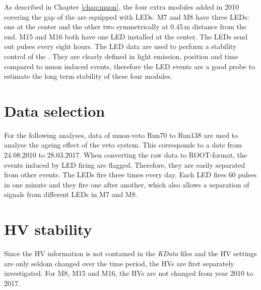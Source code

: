 As described in Chapter \ref{chap:muon}, the four extra modules added in 2010 covering the gap of the \mvs{} are equipped with LEDs. M7 and M8 have three LEDs: one at the center and the other two symmetrically at 0.45\,m distance from the end. M15 and M16 both have one LED installed at the center. The LEDs send out pulses every eight hours. The LED data are used to perform a stability control of the \mvs{}. They are clearly defined in light emission, position and time compared to muon induced events, therefore the LED events are a good probe to estimate the long term stability of these four modules.
\section{Data selection}
For the following analyses, data of muon-veto Run70 to Run138 are used to analyse the ageing effect of the veto system. This corresponds to a date from 24.08.2010 to 28.03.2017. When converting the raw data to ROOT-format, the events induced by LED firing are flagged. Therefore, they are easily separated from other events.
The LEDs fire three times every day. Each LED fires 60 pulses in one minute and they fire one after another, which also allows a separation of signals from different LEDs in M7 and M8.

\section{HV stability}
Since the HV information is not contained in the \textit{KData} files and the HV settings are only seldom changed over the time period, the HVs are first separately investigated. For M8, M15 and M16, the HVs are not changed from year 2010 to 2017.

